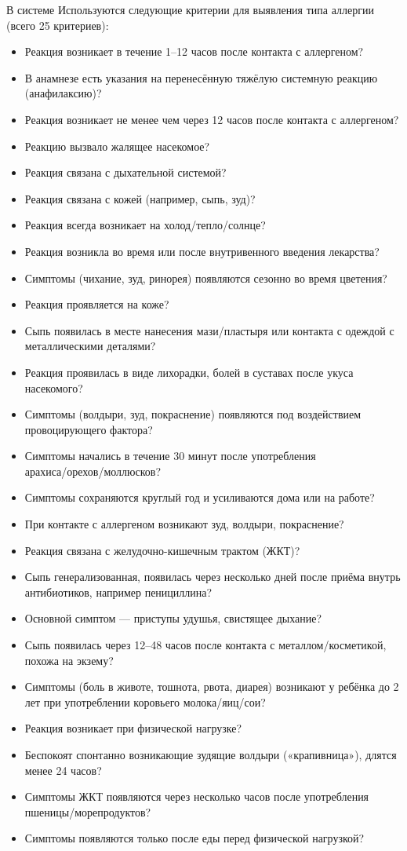 \documentclass[a4paper, final]{extarticle}
\begin{document}
	В системе Используются следующие критерии для выявления типа аллергии (всего 25 критериев):
	\begin{itemize}
		\item Реакция возникает в течение 1–12 часов после контакта с аллергеном?
		\item В анамнезе есть указания на перенесённую тяжёлую системную реакцию (анафилаксию)?
		\item Реакция возникает не менее чем через 12 часов после контакта с аллергеном?
		\item Реакцию вызвало жалящее насекомое?
		\item Реакция связана с дыхательной системой?
		\item Реакция связана с кожей (например, сыпь, зуд)?
		\item Реакция всегда возникает на холод/тепло/солнце?
		\item Реакция возникла во время или после внутривенного введения лекарства?
		\item Симптомы (чихание, зуд, ринорея) появляются сезонно во время цветения?
		\item Реакция проявляется на коже?
		\item Сыпь появилась в месте нанесения мази/пластыря или контакта с одеждой с металлическими деталями?
		\item Реакция проявилась в виде лихорадки, болей в суставах после укуса насекомого?
		\item Симптомы (волдыри, зуд, покраснение) появляются под воздействием провоцирующего фактора?
		\item Симптомы начались в течение 30 минут после употребления \\ арахиса/орехов/моллюсков?
		\item Симптомы сохраняются круглый год и усиливаются дома или на работе?
		\item При контакте с аллергеном возникают зуд, волдыри, покраснение?
		\item Реакция связана с желудочно-кишечным трактом (ЖКТ)?
		\item Сыпь генерализованная, появилась через несколько дней после приёма внутрь антибиотиков, например пенициллина?
		\item Основной симптом — приступы удушья, свистящее дыхание?
		\item Сыпь появилась через 12–48 часов после контакта с металлом/косметикой, похожа на экзему?
		\item Симптомы (боль в животе, тошнота, рвота, диарея) возникают у ребёнка до 2 лет при употреблении коровьего молока/яиц/сои?
		\item Реакция возникает при физической нагрузке?
		\item Беспокоят спонтанно возникающие зудящие волдыри («крапивница»), длятся менее 24 часов?
		\item Симптомы ЖКТ появляются через несколько часов после употребления пшеницы/морепродуктов?
		\item Симптомы появляются только после еды перед физической нагрузкой?
	\end{itemize}
	
\end{document}
